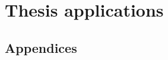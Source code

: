 \documentclass[11pt,a4paper,openright]{memoir}
\begin{document}
	\part{Thesis applications} %
	\label{prt:thesis_applications}
	
	
	
	
	
	
	
	
	
	
	
	\begin{appendices}
		
		\part{Appendices} 
		\label{prt:appendices}
		
		
		
		
		
		
		
		
	\end{appendices} %
	
	
	
	
	
	
	
\end{document}
